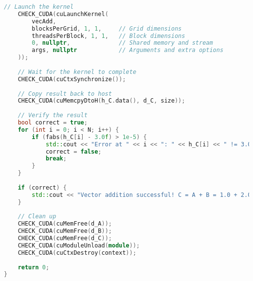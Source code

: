 \begin{lstlisting}[language=C++]
    // Launch the kernel
    CHECK_CUDA(cuLaunchKernel(
        vecAdd,
        blocksPerGrid, 1, 1,     // Grid dimensions
        threadsPerBlock, 1, 1,   // Block dimensions
        0, nullptr,              // Shared memory and stream
        args, nullptr            // Arguments and extra options
    ));
    
    // Wait for the kernel to complete
    CHECK_CUDA(cuCtxSynchronize());
    
    // Copy result back to host
    CHECK_CUDA(cuMemcpyDtoH(h_C.data(), d_C, size));
    
    // Verify the result
    bool correct = true;
    for (int i = 0; i < N; i++) {
        if (fabs(h_C[i] - 3.0f) > 1e-5) {
            std::cout << "Error at " << i << ": " << h_C[i] << " != 3.0\n";
            correct = false;
            break;
        }
    }
    
    if (correct) {
        std::cout << "Vector addition successful! C = A + B = 1.0 + 2.0 = 3.0\n";
    }
    
    // Clean up
    CHECK_CUDA(cuMemFree(d_A));
    CHECK_CUDA(cuMemFree(d_B));
    CHECK_CUDA(cuMemFree(d_C));
    CHECK_CUDA(cuModuleUnload(module));
    CHECK_CUDA(cuCtxDestroy(context));
    
    return 0;
}
\end{lstlisting}

